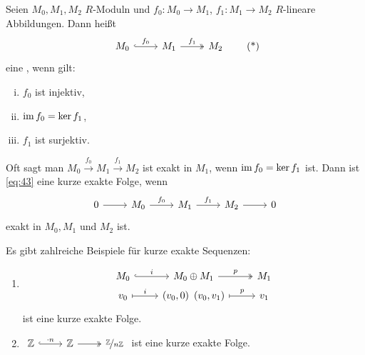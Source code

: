 \begin{definition}[{name=[Kurze exakte Sequenz]}]
	Seien $M_0, M_1, M_2$ $R$-Moduln und $f_0 \colon M_0 \to M_1$, $f_1 \colon M_1 \to M_2$ $R$-lineare Abbildungen. Dann heißt 
	\begin{equation*}
		\begin{tikzcd}
			M_0 \rar["f_0", hook] & M_1 \rar["f_1", two heads]& M_2 
		\end{tikzcd} \label{eq:43} \tag{*}
	\end{equation*}
	eine , wenn gilt:
	\begin{multicols}{3}
		\begin{enumerate}[(i)]
			\item $f_0$ ist injektiv,
			\item $\operatorname{im} f_0 = \ker f_1$,
			\item $f_1$ ist surjektiv.
		\end{enumerate}
	\end{multicols}
\end{definition}

Oft sagt man $M_0 \xrightarrow{f_0} M_1 \xrightarrow{f_1} M_2$ ist exakt in $M_1$, wenn $\operatorname{im} f_0 = \ker f_1$ ist. Dann ist \eqref{eq:43} eine kurze exakte Folge, wenn
\[
	\begin{tikzcd}
		0 \rar & M_0 \rar["f_0"] & M_1 \rar["f_1"]& M_2 \rar & 0
	\end{tikzcd}
\]
exakt in $M_0, M_1$ und $M_2$ ist.

\begin{beispiel}
	Es gibt zahlreiche Beispiele für kurze exakte Sequenzen:
	\begin{enumerate}[1)]
		\item \[
			\begin{tikzcd}[row sep=0.3em]
				M_0 \rar["i",hook] & M_0 \oplus M_1 \rar["p",two heads] & M_1 \\
				v_0 \rar["i", mapsto] & (v_0,0) \enspace (v_0,v_1) \rar["p",mapsto] & v_1
			\end{tikzcd}
		\]
		ist eine kurze exakte Folge.
		\item $\begin{tikzcd}
			\mathbb{Z} \rar[hook,"\cdot n"] & \mathbb{Z} \rar[two heads] &  \nicefrac{\mathbb{Z}}{n \mathbb{Z}}
		\end{tikzcd}$
		ist eine kurze exakte Folge.
	\end{enumerate}
\end{beispiel}

